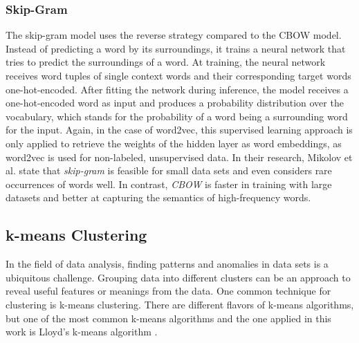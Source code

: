\subsubsection{Skip-Gram}
The skip-gram model uses the reverse strategy compared to the CBOW model. Instead of predicting a word by its surroundings, it trains a neural network that tries to predict the surroundings of a word. At training, the neural network receives word tuples of single context words and their corresponding target words one-hot-encoded. After fitting the network during inference, the model receives a one-hot-encoded word as input and produces a probability distribution over the vocabulary, which stands for the probability of a word being a surrounding word for the input. Again, in the case of word2vec, this supervised learning approach is only applied to retrieve the weights of the hidden layer as word embeddings, as word2vec is used for non-labeled, unsupervised data. In their research, Mikolov et al. state that \emph{skip-gram} is feasible for small data sets and even considers rare occurrences of words well. In contrast, \emph{CBOW} is faster in training with large datasets and better at capturing the semantics of high-frequency words. 

\subsection{k-means Clustering}
In the field of data analysis, finding patterns and anomalies in data sets is a ubiquitous challenge. Grouping data into different clusters can be an approach to reveal useful features or meanings from the data. One common technique for clustering is k-means clustering. There are different flavors of k-means algorithms, but one of the most common k-means algorithms and the one applied in this work is Lloyd's k-means algorithm \cite{wilkin2007kmeans}. 

